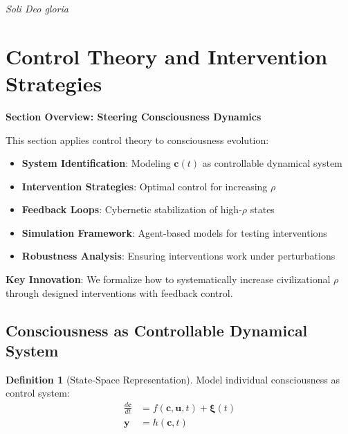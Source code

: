 \documentclass[11pt,a4paper]{article}
\theoremstyle{definition}
\newtheorem{definition}{Definition}[section]
\theoremstyle{remark}
\newcommand{\cc}{\mathbf{c}}
\begin{document}
\begin{enumerate}
\begin{center}
\textit{Soli Deo gloria}
\end{center}


\section{Control Theory and Intervention Strategies}

\begin{mdframed}[backgroundcolor=cyan!5,linewidth=2pt]
\textbf{Section Overview: Steering Consciousness Dynamics}

This section applies control theory to consciousness evolution:

\begin{itemize}[nosep]
    \item \textbf{System Identification}: Modeling \(\cc(t)\) as controllable dynamical system
    \item \textbf{Intervention Strategies}: Optimal control for increasing \(\rho\)
    \item \textbf{Feedback Loops}: Cybernetic stabilization of high-\(\rho\) states
    \item \textbf{Simulation Framework}: Agent-based models for testing interventions
    \item \textbf{Robustness Analysis}: Ensuring interventions work under perturbations
\end{itemize}

\textbf{Key Innovation}: We formalize how to systematically increase civilizational \(\rho\) through designed interventions with feedback control.
\end{mdframed}

\subsection{Consciousness as Controllable Dynamical System}

\begin{definition}[State-Space Representation]
Model individual consciousness as control system:
\begin{align}
\frac{d\cc}{dt} &= f(\cc, \mathbf{u}, t) + \boldsymbol{\xi}(t) \\
\mathbf{y} &= h(\cc, t)
\end{align}


\end{definition}
\end{enumerate}
\end{document}
